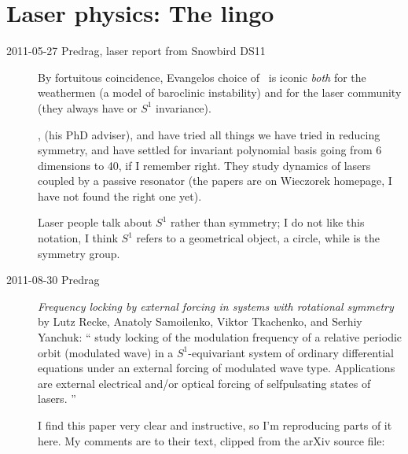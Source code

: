 
\chapter{Laser physics: The lingo}
\label{chap:lasers}

\renewcommand{\LieElrep}{\ensuremath{\mathbf{G}}} %
\renewcommand{\LieEl}{\ensuremath{\gamma}}  %
\renewcommand{\gSpace}{\ensuremath{{\bf \theta}}}   %


\begin{description}

\item[2011-05-27 Predrag, laser report from Snowbird DS11]
												\toCB
By fortuitous coincidence, Evangelos choice of \cLe\ is iconic
{\em both}  for
the weathermen (a model of baroclinic instability) and for the laser
community (they always have  or $S^1$ invariance).

,
 (his PhD adviser), and
have tried all things we have tried in reducing  symmetry, and
have settled for invariant polynomial basis going from 6 dimensions to 40,
if I remember right. They study dynamics of
lasers coupled by a passive resonator (the papers are on Wieczorek
homepage, I have not found the right one yet).

												\toCB
Laser people talk about $S^1$ rather than  symmetry;
I do not like this notation, I think $S^1$ refers to a geometrical
object, a circle, while  is the symmetry group.


\item[2011-08-30 Predrag]
{\em Frequency locking by external forcing in systems with rotational
symmetry } by Lutz Recke, Anatoly Samoilenko, Viktor Tkachenko, and
Serhiy Yanchuk: `` study locking of the modulation
frequency of a relative periodic orbit (modulated wave) in a
$S^{1}$-equivariant system of ordinary differential equations under an
external forcing of modulated wave type. Applications are external
electrical and/or optical forcing of selfpulsating states of lasers.
''

I find this paper very clear and instructive, so I'm reproducing parts of
it here. My comments are to their text, clipped from the arXiv source
file:


\end{description}

